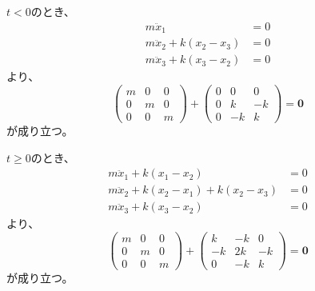 \documentclass[a4paper]{jsarticle}
\begin{document}
\section{}
\subsection{}
$t < 0$のとき、
\begin{equation}
  \begin{aligned}
    m \ddot{x}_1                 & = 0 \\
    m \ddot{x}_2 + k (x_2 - x_3) & = 0 \\
    m \ddot{x}_3 + k (x_3 - x_2) & = 0
  \end{aligned}
\end{equation}
より、
\begin{equation}
  \begin{pmatrix}
    m & 0 & 0 \\
    0 & m & 0 \\
    0 & 0 & m
  \end{pmatrix} +
  \begin{pmatrix}
    0 & 0  & 0  \\
    0 & k  & -k \\
    0 & -k & k
  \end{pmatrix} = \boldsymbol{0}
\end{equation}
が成り立つ。\par
$t \geq 0$のとき、
\begin{equation}
  \begin{aligned}
    m \ddot{x}_1 + k (x_1 - x_2)                 & = 0 \\
    m \ddot{x}_2 + k (x_2 - x_1) + k (x_2 - x_3) & = 0 \\
    m \ddot{x}_3 + k (x_3 - x_2)                 & = 0
  \end{aligned}
\end{equation}
より、
\begin{equation}
  \begin{pmatrix}
    m & 0 & 0 \\
    0 & m & 0 \\
    0 & 0 & m
  \end{pmatrix} +
  \begin{pmatrix}
    k  & -k & 0  \\
    -k & 2k & -k \\
    0  & -k & k
  \end{pmatrix} = \boldsymbol{0}
\end{equation}
が成り立つ。
\end{document}
